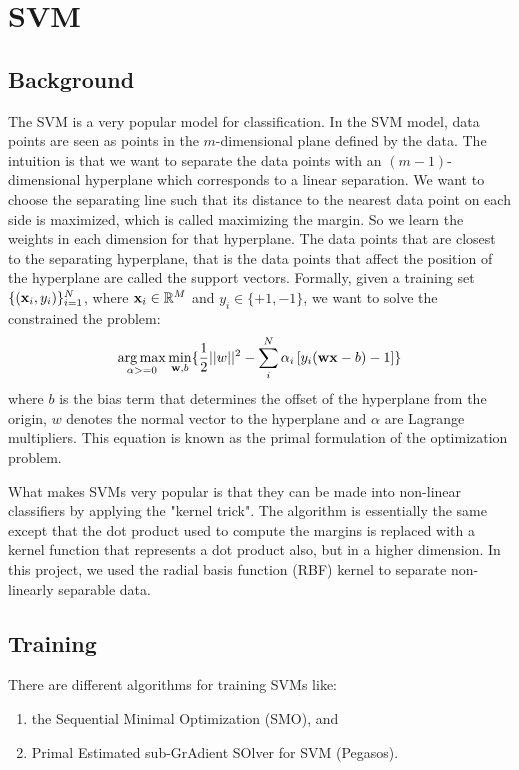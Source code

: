 \documentclass[11pt,letterpaper]{article}
\DeclareMathOperator*{\argmax}{arg\,max}
\newcommand{\vw}{{\bf w}}
\newcommand{\vx}{{\bf x}}
\newcommand{\valpha}{{\bf \alpha}}
\newcommand{\vxi}{{\bf x}_i}
\newcommand{\yi}{y_i}
\begin{document}
\section{SVM}

\subsection{Background}
	The SVM is a very popular model for classification. In the SVM model, data points are seen as points in the $m$-dimensional plane defined by the data. The intuition is that we want to separate the data points with an $(m-1)$-dimensional hyperplane which corresponds to a linear separation. We want to choose the separating line such that its distance to the nearest data point on each side is maximized, which is called maximizing the margin. So we learn the weights in each dimension for that hyperplane. The data points that are closest to the separating hyperplane, that is the data points that affect the position of the hyperplane are called the support vectors. Formally, given a training set $\{(\vxi,\yi)\}_{i=1}^N$, where $\vx_i \in \mathbb{R}^M$ and $y_i \in\{+1,-1\}$, we want to solve the constrained the problem:
\begin{align}
\argmax_{\valpha >= 0} \min_{\vw,b} \{ \frac{1}{2} ||w||^2  - \sum_i^N \alpha_i\left[\yi(\vw \vx - b) - 1\right]  \}
\end{align}
where $b$ is the bias term that determines the offset of the hyperplane from the origin, $w$ denotes the normal vector to the hyperplane and $\alpha$ are Lagrange multipliers. This equation is known as the primal formulation of the optimization problem.

What makes SVMs very popular is that they can be made into non-linear classifiers by applying the "kernel trick". The algorithm is essentially the same except that the dot product used to compute the margins is replaced with a kernel function that represents a dot product also, but in a higher dimension. In this project, we used the radial basis function (RBF) kernel to separate non-linearly separable data.

\subsection{Training}
There are different algorithms for training SVMs like:
\begin{enumerate}
\item
the Sequential Minimal Optimization (SMO), and
\item
Primal Estimated sub-GrAdient SOlver for SVM (Pegasos).
\end{enumerate} 
\end{document}
